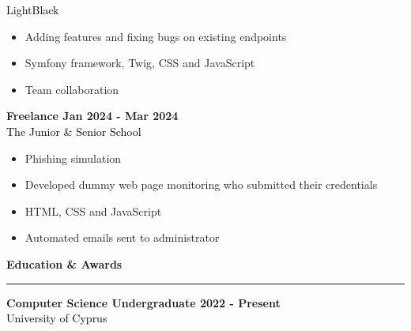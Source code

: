 \documentclass[12pt]{article}
\begin{document}
\begin{paracol}{2}
      \textcolor{black}{LightBlack}\\[0.5em]
      {\renewcommand{\labelitemi}{\textcolor{bgcolor}{\normalsize$\bullet$}}%
      \begin{itemize}[leftmargin=33pt, itemsep=0pt, topsep=0pt]
         \item Adding features and fixing bugs on existing endpoints\\
            \item Symfony framework, Twig, CSS and JavaScript\\
            \item Team collaboration\\
         \end{itemize}
      }
      \vspace{0.5cm}
      \textbf{\textcolor{bgcolor}{Freelance \hfill Jan 2024 - Mar 2024}}\\[0.5em]
      \textcolor{black}{The Junior \& Senior School}\\[0.5em]
      {\renewcommand{\labelitemi}{\textcolor{bgcolor}{\normalsize$\bullet$}}%
      \begin{itemize}[leftmargin=33pt, itemsep=0pt, topsep=0pt]
            \item Phishing simulation\\
            \item Developed dummy web page monitoring who submitted their credentials\\
            \item HTML, CSS and JavaScript\\
            \item Automated emails sent to administrator\\
         \end{itemize}
      }
      \vspace{1cm}
      {\fontsize{14pt}{13pt}\selectfont
      \textbf{\textcolor{bgcolor}{Education \& Awards}}\\[0.3em]
      }
      \hrule
      \vspace{0.5cm}
      \textbf{\textcolor{bgcolor}{Computer Science Undergraduate \hfill 2022 - Present}}\\[0.5em]
      \textcolor{black}{University of Cyprus}\\[0.5em]
      {\renewcommand{\labelitemi}{\textcolor{bgcolor}{\normalsize$\bullet$}}%
      \begin{itemize}[leftmargin=33pt, itemsep=0pt, topsep=0pt]

\end{itemize}}
\end{paracol}
\end{document}
